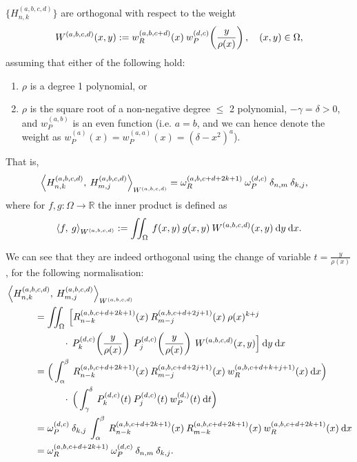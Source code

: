 \documentclass[11pt, oneside]{article}   	%
\newcommand{\R}{\mathbb{R}}
\newcommand{\hdop}{H}
\newcommand{\hdopnk}{\hdop_{n,k}}
\newcommand{\hdopmj}{\hdop_{m,j}}
\newcommand{\jac}{{P}}
\newcommand{\genjac}{R}
\newcommand{\genjacnmk}{\genjac_{n-k}}
\newcommand{\genjacmmj}{\genjac_{m-j}}
\newcommand{\genjacw}{w_\genjac}
\newcommand{\jacw}{w_P}
\newcommand{\normgenjac}{\omega_\genjac}
\newcommand{\normjac}{\omega_P}
\newcommand{\hdopnkabcd}{\hdop_{n,k}^{(a,b,c,d)}}
\newcommand{\Wabcd}{{W^{(a,b,c,d)}}}
\newcommand{\hdopmjabcd}{\hdop_{m,j}^{(a,b,c,d)}}
\begin{document}
$\{\hdopnk^{(a,b,c,d)}\}$ are orthogonal with respect to the weight
\begin{align*}
	W^{(a,b,c,d)}(x,y) := \genjacw^{(a,b,c+d)}(x) \: \jacw^{(d,c)}\fpr(\frac{y}{\rho(x)}), \quad (x,y) \in \Omega,
\end{align*}
assuming that either of the following hold:
\begin{enumerate}
\item  \(\rho\) is a degree 1 polynomial, or 
\item \(\rho\) is the square root of a non-negative degree \(\le\) 2 polynomial, \(-\gamma = \delta > 0\), and \(\jacw^{(a,b)}\) is an even function (i.e. $a = b$, and we can hence denote the weight as $\jacw^{(a)}(x) = w^{(a,a)}_P(x) =  (\delta-x^2)^a$).
\end{enumerate}
That is,
\begin{align*}
	\ip< \hdopnk^{(a,b,c,d)}, \: \hdopmj^{(a,b,c,d)} >_{W^{(a,b,c,d)}} &= \normgenjac^{(a,b,c+d+2k+1)} \: \normjac^{(d,c)} \: \delta_{n,m} \: \delta_{k,j},
\end{align*}
where for $f, g : \Omega \to \R$ the inner product is defined as 
\begin{align*}
	\ip< f, \: g >_{W^{(a,b,c,d)}} := \iint_\Omega \: f(x,y) \: g(x,y) \: W^{(a,b,c,d)}(x,y) \: \D y \: \D x.
\end{align*}

We can see that they are indeed orthogonal using the change of variable $t = \frac{y}{\rho(x)}$, for the following normalisation:
\begin{align}
	&\ip< \hdopnkabcd, \: \hdopmjabcd >_\Wabcd \\
	&\quad \quad \quad =  \iint_\Omega \: \Big[ \genjacnmk^{(a,b,c+d+2k+1)}(x) \: \genjacmmj^{(a,b,c+d+2j+1)}(x) \: \rho(x)^{k+j}  \nonumber \\
		&\quad \quad \quad \quad \quad \quad \cdot \: \jac_k^{(d,c)}\fpr(\frac{y}{\rho(x)}) \: \jac_j^{(d,c)}\fpr(\frac{y}{\rho(x)})  \: \Wabcd(x,y) \Big] \: \D y \: \D x \nonumber \\
	&\quad \quad \quad = \Big( \int_\alpha^\beta \: {\genjacnmk^{(a,b,c+d+2k+1)}}(x) \: {\genjacmmj^{(a,b,c+d+2j+1)}}(x) \: \genjacw^{(a,b,c+d+k+j+1)}(x) \: \D x \Big) \nonumber \\
	&\quad \quad \quad \quad \quad \quad \cdot \: \Big( \int_\gamma^\delta \: {\jac_k^{(d,c)}}(t) \:  {\jac_j^{(d,c)}}(t) \: \jacw^{(d,)}(t) \: \D t \Big) \nonumber \\
	&\quad \quad \quad = \normjac^{(d,c)} \: \delta_{k,j} \: \int_\alpha^\beta \: {\genjacnmk^{(a,b,c+d+2k+1)}}(x) \: {\genjac_{m-k}^{(a,b,c+d+2k+1)}}(x) \: \genjacw^{(a,b,c+d+2k+1)}(x) \: \D x \nonumber \\ 
	&\quad \quad \quad = \normgenjac^{(a,b,c+d+2k+1)} \: \normjac^{(d,c)} \: \delta_{n,m} \: \delta_{k,j}. \label{eqn:normhdop}
\end{align}
\end{document}

